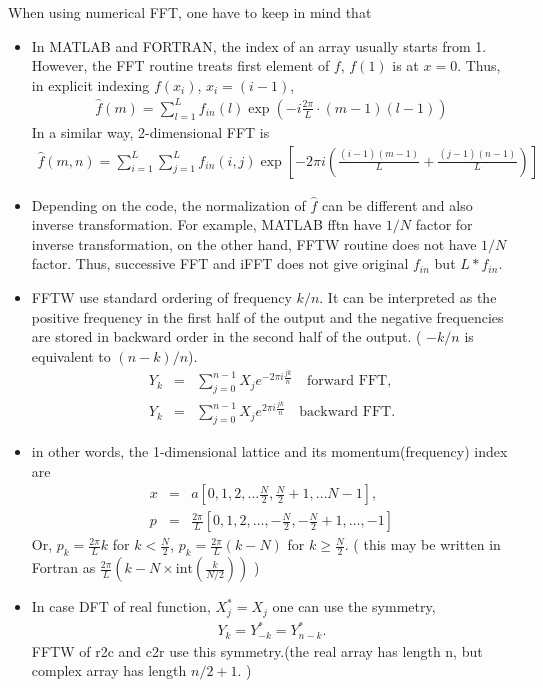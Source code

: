 \documentclass[10pt]{book}
\newcommand{\bea}{\begin{eqnarray}}
\newcommand{\eea}{\end{eqnarray}}
\newcommand{\no}{\nonumber \\}
\begin{document}
When using numerical FFT, one have to keep in mind that 
\begin{itemize}
	\item In MATLAB and FORTRAN, the index of an array usually starts from 1. 
	      However, the FFT routine treats first element of $f$, $f(1)$ is at $x=0$.
	      Thus, in explicit indexing $f(x_i)$, $x_i=(i-1)$, 
	      \bea 
	       \hat{f}(m)=\sum_{l=1}^L f_{in}(l)\exp\left(-i \frac{2\pi}{L}\cdot(m-1)(l-1)\right)
	      \eea 
	      In a similar way, 2-dimensional FFT is
	      \bea 
	       \hat{f}(m,n)=\sum_{i=1}^{L}\sum_{j=1}^L f_{in}(i,j) \exp\left[-2\pi i\left(\frac{(i-1)(m-1)}{L}+\frac{(j-1)(n-1)}{L}\right)  \right] 
	      \eea  
	 \item Depending on the code, the normalization of $\hat{f}$ can be different
	      and also inverse transformation. 
	      For example, MATLAB fftn have $1/N$ factor for inverse transformation,
	      on the other hand, FFTW routine does not have $1/N$ factor.
	      Thus, successive FFT and iFFT does not give original $f_{in}$ but $L*f_{in}$. 
    \item FFTW use standard ordering of frequency $k/n$. It can be interpreted as
          the positive frequency in the first half of the output and the negative 
          frequencies are stored in backward order in the second half of the output.
          ( $-k/n$ is equivalent to $(n-k)/n$).
          \bea
          Y_{k}&=&\sum_{j=0}^{n-1} X_{j} e^{-2\pi i \frac{jk}{n}} \quad \mbox{forward FFT},\no 
          Y_{k}&=&\sum_{j=0}^{n-1} X_{j} e^{2\pi i \frac{jk}{n}} \quad \mbox{backward FFT}. 
          \eea  	
    \item in other words, the 1-dimensional lattice and its momentum(frequency) index are 
          \bea 
             x&=&a \left[0,1,2,\dots \frac{N}{2},\frac{N}{2}+1,\dots N-1\right],\no 
             p&=&\frac{2\pi}{L}\left[0,1,2,\dots, -\frac{N}{2}, -\frac{N}{2}+1,\dots, -1\right]
          \eea 
          Or, $p_k=\frac{2\pi}{L} k$ for $k<\frac{N}{2}$,
             $p_k=\frac{2\pi}{L}(k-N)$ for $k\geq \frac{N}{2}$.
             ( this may be written in Fortran as
             $\frac{2\pi}{L}(k-N\times \mbox{int}(\frac{k}{N/2}) )$ )
             
    \item In case DFT of real function, $X_j^*=X_j$ one can use the symmetry,
         \bea 
         Y_{k}=Y_{-k}^*=Y_{n-k}^*.
         \eea  
         FFTW of r2c and c2r use this symmetry.(the real array has length n, but complex array has 
         length $n/2+1$. )                    
\end{itemize}
\end{document}
